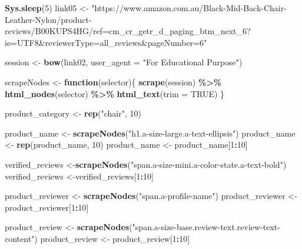 \documentclass[
]{article}
\newenvironment{Shaded}{\begin{snugshade}}{\end{snugshade}}
\newcommand{\AttributeTok}[1]{\textcolor[rgb]{0.13,0.29,0.53}{#1}}
\newcommand{\ConstantTok}[1]{\textcolor[rgb]{0.56,0.35,0.01}{#1}}
\newcommand{\ControlFlowTok}[1]{\textcolor[rgb]{0.13,0.29,0.53}{\textbf{#1}}}
\newcommand{\DecValTok}[1]{\textcolor[rgb]{0.00,0.00,0.81}{#1}}
\newcommand{\FunctionTok}[1]{\textcolor[rgb]{0.13,0.29,0.53}{\textbf{#1}}}
\newcommand{\NormalTok}[1]{#1}
\newcommand{\OtherTok}[1]{\textcolor[rgb]{0.56,0.35,0.01}{#1}}
\newcommand{\SpecialCharTok}[1]{\textcolor[rgb]{0.81,0.36,0.00}{\textbf{#1}}}
\newcommand{\StringTok}[1]{\textcolor[rgb]{0.31,0.60,0.02}{#1}}
\begin{document}
\begin{Shaded}
\begin{Highlighting}[]
   \FunctionTok{Sys.sleep}\NormalTok{(}\DecValTok{5}\NormalTok{)}
\NormalTok{link05 }\OtherTok{\textless{}{-}} \StringTok{"https://www.amazon.com.au/Black{-}Mid{-}Back{-}Chair{-}Leather{-}Nylon/product{-}reviews/B00KUPS4HG/ref=cm\_cr\_getr\_d\_paging\_btm\_next\_6?ie=UTF8\&reviewerType=all\_reviews\&pageNumber=6"}


\NormalTok{  session }\OtherTok{\textless{}{-}} \FunctionTok{bow}\NormalTok{(link02,}
               \AttributeTok{user\_agent =} \StringTok{"For Educational Purpose"}\NormalTok{)}

\NormalTok{  scrapeNodes }\OtherTok{\textless{}{-}} \ControlFlowTok{function}\NormalTok{(selector)\{}
    \FunctionTok{scrape}\NormalTok{(session) }\SpecialCharTok{\%\textgreater{}\%}
      \FunctionTok{html\_nodes}\NormalTok{(selector) }\SpecialCharTok{\%\textgreater{}\%}
      \FunctionTok{html\_text}\NormalTok{(}\AttributeTok{trim =} \ConstantTok{TRUE}\NormalTok{)}
\NormalTok{  \}}

\NormalTok{  product\_category }\OtherTok{\textless{}{-}} \FunctionTok{rep}\NormalTok{(}\StringTok{"chair"}\NormalTok{, }\DecValTok{10}\NormalTok{)}

\NormalTok{  product\_name }\OtherTok{\textless{}{-}} \FunctionTok{scrapeNodes}\NormalTok{(}\StringTok{"h1.a{-}size{-}large.a{-}text{-}ellipsis"}\NormalTok{)}
\NormalTok{  product\_name }\OtherTok{\textless{}{-}} \FunctionTok{rep}\NormalTok{(product\_name, }\DecValTok{10}\NormalTok{)}
\NormalTok{  product\_name }\OtherTok{\textless{}{-}}\NormalTok{ product\_name[}\DecValTok{1}\SpecialCharTok{:}\DecValTok{10}\NormalTok{]}
  
\NormalTok{  verified\_reviews }\OtherTok{\textless{}{-}}\FunctionTok{scrapeNodes}\NormalTok{(}\StringTok{"span.a{-}size{-}mini.a{-}color{-}state.a{-}text{-}bold"}\NormalTok{)}
\NormalTok{  verified\_reviews }\OtherTok{\textless{}{-}}\NormalTok{verified\_reviews[}\DecValTok{1}\SpecialCharTok{:}\DecValTok{10}\NormalTok{]}
  
\NormalTok{  product\_reviewer }\OtherTok{\textless{}{-}} \FunctionTok{scrapeNodes}\NormalTok{(}\StringTok{"span.a{-}profile{-}name"}\NormalTok{)}
\NormalTok{  product\_reviewer }\OtherTok{\textless{}{-}}\NormalTok{ product\_reviewer[}\DecValTok{1}\SpecialCharTok{:}\DecValTok{10}\NormalTok{]}
  
\NormalTok{  product\_review }\OtherTok{\textless{}{-}} \FunctionTok{scrapeNodes}\NormalTok{(}\StringTok{"span.a{-}size{-}base.review{-}text.review{-}text{-}content"}\NormalTok{)}
\NormalTok{  product\_review }\OtherTok{\textless{}{-}}\NormalTok{ product\_review[}\DecValTok{1}\SpecialCharTok{:}\DecValTok{10}\NormalTok{]}
  

\end{Highlighting}
\end{Shaded}
\end{document}
